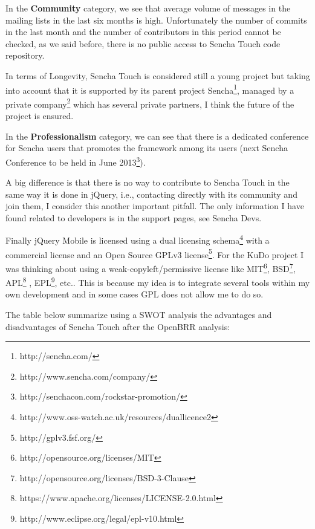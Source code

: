 \documentclass[a4paper,12pt]{book}
\begin{document}
In the \textbf{Community} category, we see that average volume of messages in the mailing lists in the last six months is high. Unfortunately the number of commits in the last month and the number of contributors in this period cannot be checked, as we said before, there is no public access to Sencha Touch code repository. 

In terms of Longevity, Sencha Touch is considered still a young project but taking into account that it is supported by its parent project Sencha\footnote{http://sencha.com/}, managed by a private company\footnote{http://www.sencha.com/company/}  which has several private partners, I think the future of the project is ensured.

In the \textbf{Professionalism} category, we can see that there is a dedicated conference for Sencha users\cite{sencha Conferences} that promotes the framework among its users  (next Sencha Conference to be held in June 2013\footnote{http://senchacon.com/rockstar-promotion/}).

A big difference is that there is no way to contribute to Sencha Touch in the same way it is done in jQuery, i.e., contacting directly with its community and join them, I consider this another important pitfall. The only information I have found related to developers is in the support pages, see Sencha Devs\cite{sencha Devs}.  

Finally jQuery Mobile is licensed using a dual licensing schema\footnote{http://www.oss-watch.ac.uk/resources/duallicence2}  with a commercial license and an Open Source GPLv3 license\footnote{http://gplv3.fsf.org/}. For the KuDo project I was thinking about using a weak-copyleft/permissive license like MIT\footnote{http://opensource.org/licenses/MIT}, BSD\footnote{http://opensource.org/licenses/BSD-3-Clause}, APL\footnote{https://www.apache.org/licenses/LICENSE-2.0.html} , EPL\footnote{http://www.eclipse.org/legal/epl-v10.html}, etc.. This is because my idea is to integrate several tools within my own development and in some cases GPL does not allow me to do so. 

The table below summarize using a SWOT analysis the advantages and disadvantages of Sencha Touch after the OpenBRR analysis:
\end{document}
